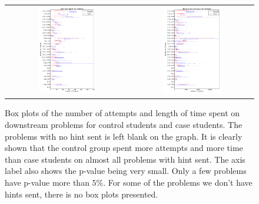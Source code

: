 \documentclass{llncs2e/llncs}
\begin{document}
\begin{figure}[ht]
  \centering
  \begin{tabular}{c c}
  \includegraphics[width=0.5\textwidth]{image/problem_tries_downstream.png} & 
  \includegraphics[width=0.5\textwidth]{image/problem_time_downstream.png}
  \end{tabular}
  \caption{Box plots of the number of attempts and length of time spent on downstream problems for control students and case students. The problems with no hint sent is left blank on the graph. It is clearly shown that the control group spent more attempts and more time than case students on almost all problems with hint sent. The axis label also shows the p-value being very small. Only a few problems have p-value more than $5\%$. For some of the problems we don't have hints sent, there is no box plots presented.}
   \label{fig:prob_tries_analysis}
\end{figure}
\end{document}
